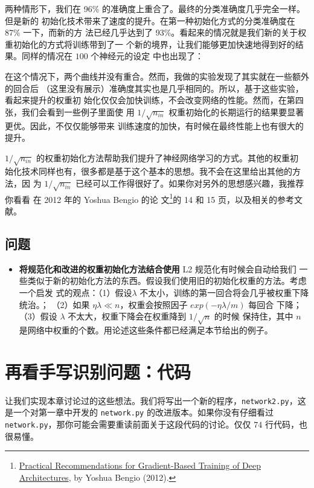 两种情形下，我们在 96\% 的准确度上重合了。最终的分类准确度几乎完全一样。但是新的
初始化技术带来了速度的提升。在第一种初始化方式的分类准确度在 87\% 一下，而新的方
法已经几乎达到了 93\%。看起来的情况就是我们新的关于权重初始化的方式将训练带到了一
个新的境界，让我们能够更加快速地得到好的结果。同样的情况在 $100$ 个神经元的设定
中也出现了：

在这个情况下，两个曲线并没有重合。然而，我做的实验发现了其实就在一些额外的回合后
（这里没有展示）准确度其实也是几乎相同的。所以，基于这些实验，看起来提升的权重初
始化仅仅会加快训练，不会改变网络的性能。然而，在第四张，我们会看到一些例子里面使
用 $1/\sqrt{n_{in}}$ 权重初始化的长期运行的结果要显著更优。因此，不仅仅能够带来
训练速度的加快，有时候在最终性能上也有很大的提升。

$1/\sqrt{n_{in}}$ 的权重初始化方法帮助我们提升了神经网络学习的方式。其他的权重初
始化技术同样也有，很多都是基于这个基本的思想。我不会在这里给出其他的方法，因
为 $1/\sqrt{n_{in}}$ 已经可以工作得很好了。如果你对另外的思想感兴趣，我推荐你看看
在 2012 年的 Yoshua Bengio 的论
文\footnote{\href{http://arxiv.org/pdf/1206.5533v2.pdf}{Practical
    Recommendations for Gradient-Based Training of Deep Architectures}, by
  Yoshua Bengio (2012).  }的 14 和 15 页，以及相关的参考文献。

\subsection*{问题}

\begin{itemize}
\item \textbf{将规范化和改进的权重初始化方法结合使用} L2 规范化有时候会自动给我们
  一些类似于新的初始化方法的东西。假设我们使用旧的初始化权重的方法。考虑一个启发
  式的观点：（1）假设$\lambda$ 不太小，训练的第一回合将会几乎被权重下降统治。；
  （2）如果 $\eta\lambda \ll n$，权重会按照因子 $exp(-\eta\lambda/m)$ 每回合
  下降；（3）假设 $\lambda$ 不太大，权重下降会在权重降到 $1/\sqrt{n}$ 的时候
  保持住，其中 $n$ 是网络中权重的个数。用论述这些条件都已经满足本节给出的例子。
\end{itemize}

\section{再看手写识别问题：代码}
\label{sec:handwriting_recognition_revisited_the_code}

让我们实现本章讨论过的这些想法。我们将写出一个新的程序，\lstinline!network2.py!，这是一个对第一章中开发的 \lstinline!network.py! 的改进版本。如果你没有仔细看过 \lstinline!network.py!，那你可能会需要重读前面关于这段代码的讨论。仅仅 $74$ 行代码，也很易懂。

